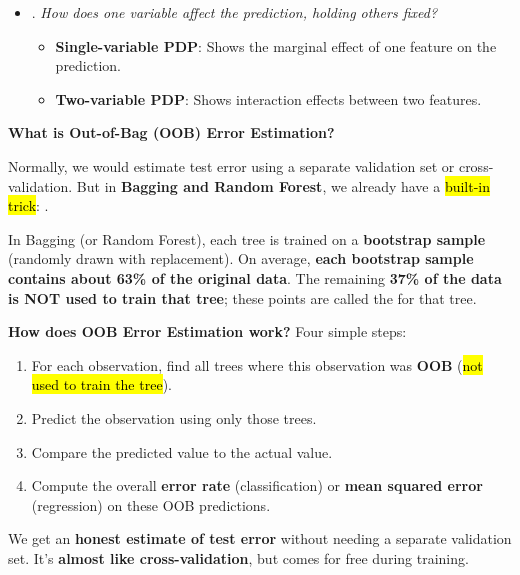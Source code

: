 \begin{enumerate}
\begin{itemize}
        \item {}. \emph{How does one variable affect the prediction, holding others fixed?}
        \begin{itemize}
            \item \textbf{Single-variable PDP}: Shows the marginal effect of one feature on the prediction.
            \item \textbf{Two-variable PDP}: Shows interaction effects between two features.
        \end{itemize}
    \end{itemize}
\end{enumerate}

\newpage

\begin{flushleft}
    \textcolor{Green3}{ \textbf{What is Out-of-Bag (OOB) Error Estimation?}}
\end{flushleft}
Normally, we would estimate test error using a separate validation set or cross-validation. But in \textbf{Bagging and Random Forest}, we already have a \hl{built-in trick}: .

\highspace
In Bagging (or Random Forest), each tree is trained on a \textbf{bootstrap sample} (randomly drawn with replacement). On average, \textbf{each bootstrap sample contains about 63\% of the original data}. The remaining \textbf{37\% of the data is NOT used to train that tree}; these points are called the  for that tree.

\highspace
\textcolor{Green3}{ \textbf{How does OOB Error Estimation work?}} Four simple steps:
\begin{enumerate}
    \item For each observation, find all trees where this observation was \textbf{OOB} (\hl{not used to train the tree}).
    \item Predict the observation using only those trees.
    \item Compare the predicted value to the actual value.
    \item Compute the overall \textbf{error rate} (classification) or \textbf{mean squared error} (regression) on these OOB predictions.
\end{enumerate}
We get an \textbf{honest estimate of test error} without needing a separate validation set. It's \textbf{almost like cross-validation}, but comes for free during training.

